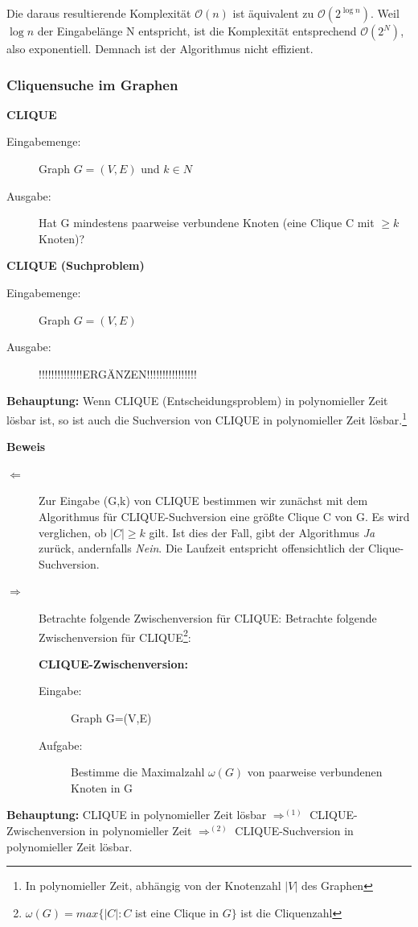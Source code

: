 \documentclass{article} %
\begin{document}
Die daraus resultierende Komplexität $\mathcal{O}(n)$ ist äquivalent zu $\mathcal{O}(2^{\log n})$.
Weil $\log n$ der Eingabelänge N entspricht, ist die Komplexität entsprechend $\mathcal{O}(2^N)$, also exponentiell.
Demnach ist der Algorithmus nicht effizient.

\subsubsection{Cliquensuche im Graphen}

\begin{framed}
\textbf{CLIQUE}\\
\begin{description}
	\item[Eingabemenge:] Graph $G= (V,E)$ und $k \in N$
	\item[Ausgabe:] Hat G mindestens paarweise verbundene Knoten (eine Clique C mit $\geq k$ Knoten)?
\end{description} 
\end{framed}

\begin{framed}
\textbf{CLIQUE (Suchproblem)}\\
\begin{description}
	\item[Eingabemenge:] Graph $G= (V,E)$
	\item[Ausgabe:] !!!!!!!!!!!!!!ERGÄNZEN!!!!!!!!!!!!!!!!
\end{description} 
\end{framed}

\textbf{Behauptung:} Wenn CLIQUE (Entscheidungsproblem) in polynomieller Zeit lösbar ist, so ist auch die Suchversion von CLIQUE in polynomieller Zeit lösbar.\footnote{In polynomieller Zeit, abhängig von der Knotenzahl $|V|$ des Graphen}

\textbf{Beweis}
\begin{description}
\item[$\Leftarrow$] Zur Eingabe (G,k) von CLIQUE  bestimmen wir zunächst mit dem Algorithmus für CLIQUE-Suchversion eine größte Clique C von G.
Es wird verglichen, ob $|C| \geq k$ gilt.
Ist dies der Fall, gibt der Algorithmus \emph{Ja} zurück, andernfalls \emph{Nein}.
Die Laufzeit entspricht offensichtlich der Clique-Suchversion.

\item[$\Rightarrow$] Betrachte folgende Zwischenversion für CLIQUE:
Betrachte folgende Zwischenversion für CLIQUE\footnote{$\omega(G) = max \{|C|: C$ ist eine Clique in $G\}$ ist die Cliquenzahl}:
\begin{framed}
\textbf{CLIQUE-Zwischenversion:}
\begin{description}
\item  [Eingabe:]Graph G=(V,E)
\item [Aufgabe:] Bestimme die Maximalzahl $\omega (G)$  von paarweise verbundenen Knoten in G
\end{description}
\end{framed}
\end{description}
\textbf{Behauptung:} CLIQUE in polynomieller Zeit lösbar $\Rightarrow^{(1)}$ CLIQUE-Zwischenversion in polynomieller Zeit $\Rightarrow^{(2)}$ CLIQUE-Suchversion in polynomieller Zeit lösbar.
\end{document}
